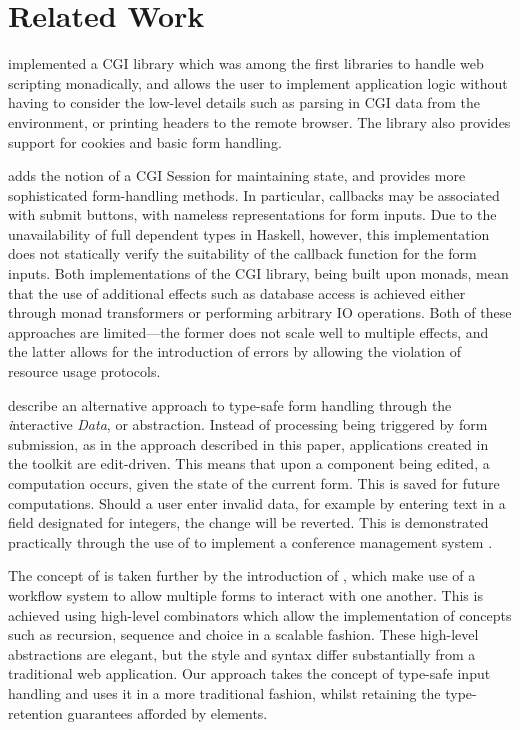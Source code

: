 \section{Related Work}
\citet{meijer:cgi} implemented a CGI library which was among the first
libraries to handle web scripting monadically, and allows the user to implement
application logic without having to consider the low-level details such as
parsing in CGI data from the environment, or printing headers to the remote
browser. The library also provides support for cookies and basic form handling. 

\citet{thiemann:wash} adds the notion of a CGI Session for maintaining
state, and provides more sophisticated form-handling methods. In particular,
callbacks may be associated with submit buttons, with nameless representations
for form inputs. Due to the unavailability of full dependent types in Haskell,
however, this implementation does not statically verify the suitability of the
callback function for the form inputs. Both implementations of the CGI library,
being built upon monads, mean that the use of additional effects such as
database access is achieved either through monad transformers or 
performing arbitrary IO operations. Both of these approaches are limited---the
former does not scale well to multiple effects, and the latter allows for the
introduction of errors by allowing the violation of resource usage protocols.

\citet{plasmeijer:idata} describe an alternative approach to type-safe form
handling through the
\textit{i}nteractive \textit{Data}, or \idata{} abstraction. Instead of
processing being triggered by form submission, as in the approach described in
this paper, applications created in the \idata{} toolkit are 
edit-driven. This means that upon a component being edited, a computation
occurs, given the state of the current form. This is saved for
future computations. Should a user enter invalid data, for example by entering
text in a field designated for integers, the change will be reverted. This is
demonstrated practically through the use of \idata{} to implement a conference
management system \cite{plasmeijer:cms}.

The concept of \idata{} is taken further by the introduction of \itasks{}
\cite{plasmeijer:itasks}, which make use of a workflow system to allow multiple
\idata{} forms to interact with one another. This is achieved using
high-level combinators which allow the implementation of concepts such as
recursion, sequence and choice in a scalable fashion. These high-level
abstractions are elegant, but the style and syntax differ substantially from a
traditional web application. Our approach takes the concept of type-safe input
handling and uses it in a more traditional fashion, whilst retaining the
type-retention guarantees afforded by \idata{} elements.

